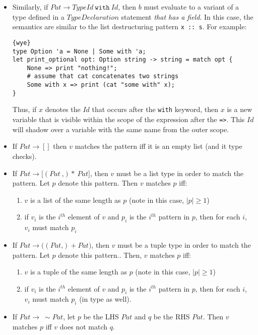 \documentclass[a4paper, 12pt]{article}
\theoremstyle{myplain}
\theoremstyle{mydefinition}
\theoremstyle{myremark}
\numberwithin{equation} {section}
\numberwithin{figure}   {section}
\numberwithin{table}    {section}
\begin{document}
\begin{itemize}
\begin{lstlisting}{wye}
type Operation = Add | Sub | Mul | Div;
let to_string op: Operation -> string = match op {
	Add => "add";
	Sub => "subtract";
	Mul => "multiply";
	Div => "divide"
}
let x = Operation.Mul;
let v = to_string x; # v is "multiply"
\end{lstlisting}
\item Similarly, if $Pat \to TypeId\:\texttt{with}\: Id$, then $b$ must evaluate to a variant of a type defined in a $TypeDeclaration$ statement \textit{that has a field}. In this case, the semantics are similar to the list destructuring pattern \texttt{x :: s}. For example:
\begin{lstlisting}{wye}
type Option 'a = None | Some with 'a;
let print_optional opt: Option string -> string = match opt {
	None => print "nothing!";
	# assume that cat concatenates two strings
	Some with x => print (cat "some with" x);
}
\end{lstlisting}
Thus, if $x$ denotes the $Id$ that occurs after the \texttt{with} keyword, then $x$ is a new variable that is visible within the scope of the expression after the \texttt{=>}. This $Id$ will shadow over a variable with the same name from the outer scope.
\item If $Pat \to []$ then $v$ matches the pattern iff it is an empty list (and it type checks).
\item If $Pat \to \texttt{[}(Pat\: \texttt{,})*\: Pat\texttt{]}$, then $v$ must be a list type in order to match the pattern. Let $p$ denote this pattern. Then $v$ matches $p$ iff:
\begin{enumerate}
\item $v$ is a list of the same length as $p$ (note in this case, $|p| \geq 1$)
\item if $v_i$ is the $i^{th}$ element of $v$ and $p_i$ is the $i^{th}$ pattern in $p$, then for each $i$, $v_i$ must match $p_i$
\end{enumerate}
\item If $Pat \to \texttt{(}(Pat\texttt{,})+ Pat\texttt{)}$, then $v$ must be a tuple type in order to match the pattern. Let $p$ denote this pattern.. Then, $v$ matches $p$ iff:
\begin{enumerate}
\item $v$ is a tuple of the same length as $p$ (note in this case, $|p| \geq 1$)
\item if $v_i$ is the $i^{th}$ element of $v$ and $p_i$ is the $i^{th}$ pattern in $p$, then for each $i$, $v_i$ must match $p_i$ (in type as well).
\end{enumerate}
\item If $Pat\to\:\sim Pat$, let $p$ be the LHS $Pat$ and $q$ be the RHS $Pat$. Then $v$ matches $p$ iff $v$ does not match $q$.
\end{itemize}
\end{document}
